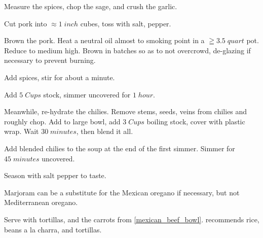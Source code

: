 \begin{preparation}
\item Measure the spices, chop the sage, and crush the garlic.
\item Cut pork into $\approx1\;inch$ cubes, toss with salt, pepper.
\item Brown the pork. Heat a neutral oil almost to smoking point in a $ \geqq 3.5\;quart$ pot. Reduce to medium high. Brown in batches so as to not overcrowd, de-glazing if necessary to prevent burning.
\item Add spices, stir for about a minute.
\item Add $5\;Cups$ stock, simmer uncovered for $1\;hour$.
\item Meanwhile, re-hydrate the chilies. Remove stems, seeds, veins from chilies and roughly chop. Add to large bowl, add $3\;Cups$ boiling stock, cover with plastic wrap. Wait $30\;minutes$, then blend it all.
\item Add blended chilies to the soup at the end of the first simmer. Simmer for $45\;minutes$ uncovered.
\item Season with salt pepper to taste.
\end{preparation}

\begin{variation}
	\item Marjoram can be a substitute for the Mexican oregano if necessary, but not Mediterranean oregano.
	\item Serve with tortillas, and the carrots from  \ref{mexican_beef_bowl}.  \citeauthor{rMartinez2015} recommends rice, beans a la charra, and tortillas.
\end{variation}

\recipeend